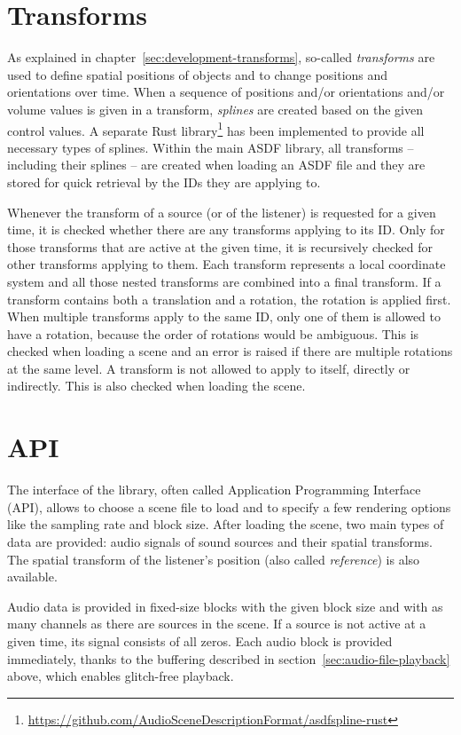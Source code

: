 \section{Transforms}

As explained in chapter~\ref{sec:development-transforms},
so-called \emph{transforms} are used to define spatial
positions of objects and to change positions and orientations over time.
When a sequence of positions and/or orientations and/or volume values
is given in a transform, \emph{splines} are created
based on the given control values.
A separate Rust library\footnote{%
\url{https://github.com/AudioSceneDescriptionFormat/asdfspline-rust}}
has been implemented to provide all necessary types of splines.
Within the main ASDF library,
all transforms -- including their splines -- are created when loading
an ASDF file and they are stored for quick retrieval by the IDs they are
applying to.

Whenever the transform of a source (or of the listener) is requested
for a given time,
it is checked whether there are any transforms applying to its ID.
Only for those transforms that are active at the given time,
it is recursively checked for other transforms applying to them.
Each transform represents a local coordinate system
and all those nested transforms are combined into a final transform.
If a transform contains both a translation and a rotation,
the rotation is applied first.
When multiple transforms apply to the same ID,
only one of them is allowed to have a rotation,
because the order of rotations would be ambiguous.
This is checked when loading a scene and an error is raised
if there are multiple rotations at the same level.
A transform is not allowed to apply to itself, directly or indirectly.
This is also checked when loading the scene.


\section{API}

The interface of the library,
often called Application Programming Interface (API),
allows to choose a scene file to load and to specify a few rendering options
like the sampling rate and block size.
After loading the scene, two main types of data are provided:
audio signals of sound sources and their spatial transforms.
The spatial transform of the listener's position (also called \emph{reference})
is also available.

Audio data is provided in fixed-size blocks with the given block size
and with as many channels as there are sources in the scene.
If a source is not active at a given time, its signal consists of all zeros.
Each audio block is provided immediately,
thanks to the buffering described
in section~\ref{sec:audio-file-playback} above,
which enables glitch-free playback.

